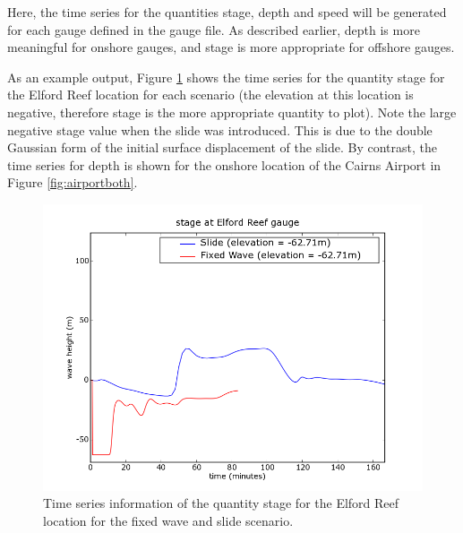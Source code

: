 \documentclass{manual}
\begin{document}


Here, the time series for the quantities stage, depth and speed will be generated for
each gauge defined in the gauge file. As described earlier, depth is more meaningful
for onshore gauges, and stage is more appropriate for offshore gauges.

As an example output,
Figure \ref{fig:reef} shows the time series for the quantity stage for the
Elford Reef location for each scenario (the elevation at this location is negative,
therefore stage is the more appropriate quantity to plot). Note the large negative stage value when the slide was
introduced. This is due to the double Gaussian form of the initial surface
displacement of the slide. By contrast, the time series for depth is shown for the onshore location of the Cairns
Airport in Figure \ref{fig:airportboth}.

\begin{figure}[htp]
  \centerline{\includegraphics[scale=0.5]{graphics/gaugeElfordReefstage.png}}
  \caption{Time series information of the quantity stage for the Elford Reef location for the
           fixed wave and slide scenario.}
  \label{fig:reef}
\end{figure}
\end{document}
